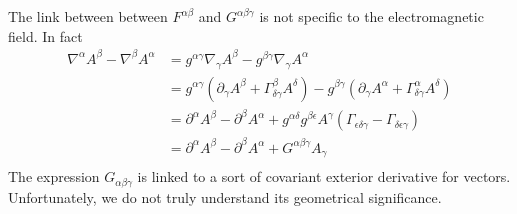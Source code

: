 The link between between $F^{\alpha\beta}$ and $G^{\alpha\beta\gamma}$ is not specific to the electromagnetic field. In fact
\begin{equation}
	\begin{aligned}
		\nabla^\alpha A^\beta - \nabla^\beta A^\alpha &= g^{\alpha\gamma} \nabla_\gamma A^\beta - g^{\beta\gamma} \nabla_\gamma A^\alpha \\
&= g^{\alpha\gamma} (\partial_\gamma A^\beta + \Gamma^\beta_{\delta\gamma} A^\delta) - g^{\beta\gamma} (\partial_\gamma A^\alpha + \Gamma^\alpha_{\delta\gamma} A^\delta) \\
&= \partial^\alpha A^\beta - \partial^\beta A^\alpha + g^{\alpha\delta} g^{\beta\epsilon} A^\gamma( \Gamma_{\epsilon\delta\gamma} - \Gamma_{\delta\epsilon\gamma}) \\
&= \partial^\alpha A^\beta - \partial^\beta A^\alpha + G^{\alpha\beta\gamma} A_\gamma \\
	\end{aligned}
\end{equation}
The expression $G_{\alpha\beta\gamma}$ is linked to a sort of covariant exterior derivative for vectors. Unfortunately, we do not truly understand its geometrical significance.

